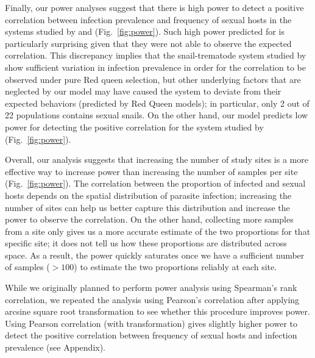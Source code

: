 \documentclass{article}\usepackage[]{graphicx}\usepackage[]{color}
\newcommand{\fref}[1]{Fig.~\ref{fig:#1}}
\begin{document}
Finally, our power analyses suggest that there is high power to detect a positive correlation between infection prevalence and frequency of sexual hosts in the systems studied by \cite{dagan2013clonal} and \cite{mckone2016fine} (\fref{power}).
Such high power predicted for \cite{dagan2013clonal} is particularly surprising given that they were not able to observe the expected correlation.
This discrepancy implies that the snail-trematode system studied by \cite{dagan2013clonal} show sufficient variation in infection prevalence in order for the correlation to be observed under pure Red queen selection, but other underlying factors that are neglected by our model may have caused the system to deviate from their expected behaviors (predicted by Red Queen models);
in particular, only 2 out of 22 populations contains sexual snails.
On the other hand, our model predicts low power for detecting the positive correlation for the system studied by \cite{vergara2014infection} (\fref{power}).

Overall, our analysis suggests that increasing the number of study sites is a more effective way to increase power than increasing the number of samples per site (\fref{power}).
The correlation between the proportion of infected and sexual hosts depends on the spatial distribution of parasite infection; 
increasing the number of sites can help us better capture this distribution and increase the power to observe the correlation.
On the other hand, collecting more samples from a site only gives us a more accurate estimate of the two proportions for that specific site; it does not tell us how these proportions are distributed across space.
As a result, the power quickly saturates once we have a sufficient number of samples ($> 100$) to estimate the two proportions reliably at each site.

While we originally planned to perform power analysis using Spearman's rank correlation,
we repeated the analysis using Pearson's correlation after applying arcsine square root transformation \citep{lively1992parthenogenesis} to see whether this procedure improves power.
Using Pearson correlation (with transformation) gives slightly higher power to detect the positive correlation between frequency of sexual hosts and infection prevalence (see Appendix).
\end{document}

